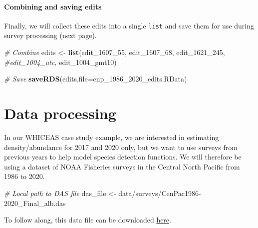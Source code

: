 \documentclass[
]{book}
\newenvironment{Shaded}{\begin{snugshade}}{\end{snugshade}}
\newcommand{\AttributeTok}[1]{\textcolor[rgb]{0.13,0.29,0.53}{#1}}
\newcommand{\CommentTok}[1]{\textcolor[rgb]{0.56,0.35,0.01}{\textit{#1}}}
\newcommand{\FunctionTok}[1]{\textcolor[rgb]{0.13,0.29,0.53}{\textbf{#1}}}
\newcommand{\NormalTok}[1]{#1}
\newcommand{\OtherTok}[1]{\textcolor[rgb]{0.56,0.35,0.01}{#1}}
\newcommand{\StringTok}[1]{\textcolor[rgb]{0.31,0.60,0.02}{#1}}
\begin{document}
\hypertarget{combining-and-saving-edits}{%
\subsubsection*{Combining and saving edits}\label{combining-and-saving-edits}}

Finally, we will collect these edits into a single \texttt{list} and save them for use during survey processing (next page).

\begin{Shaded}
\begin{Highlighting}[]
\CommentTok{\# Combine}
\NormalTok{edits }\OtherTok{\textless{}{-}} \FunctionTok{list}\NormalTok{(edit\_1607\_55,}
\NormalTok{              edit\_1607\_68,}
\NormalTok{              edit\_1621\_245,}
              \CommentTok{\#edit\_1004\_utc,}
\NormalTok{              edit\_1004\_gmt10)}

\CommentTok{\# Save}
\FunctionTok{saveRDS}\NormalTok{(edits,}\AttributeTok{file=}\StringTok{\textquotesingle{}cnp\_1986\_2020\_edits.RData\textquotesingle{}}\NormalTok{)}
\end{Highlighting}
\end{Shaded}

\hypertarget{processing}{%
\chapter{Data processing}\label{processing}}

In our WHICEAS case study example, we are interested in estimating density/abundance for 2017 and 2020 only, but we want to use surveys from previous years to help model species detection functions. We will therefore be using a dataset of NOAA Fisheries surveys in the Central North Pacific from 1986 to 2020.

\begin{Shaded}
\begin{Highlighting}[]
\CommentTok{\# Local path to DAS file}
\NormalTok{das\_file }\OtherTok{\textless{}{-}} \StringTok{\textquotesingle{}data/surveys/CenPac1986{-}2020\_Final\_alb.das\textquotesingle{}}
\end{Highlighting}
\end{Shaded}

To follow along, this data file can be downloaded \href{https://raw.githubusercontent.com/emk-noaa/LTAvignette/main/data/surveys/CenPac1986-2020_Final_alb.das?token=GHSAT0AAAAAACFPESQVLR7DOE4I3UD4UJ2YZGRILEQ}{here}.
\end{document}
